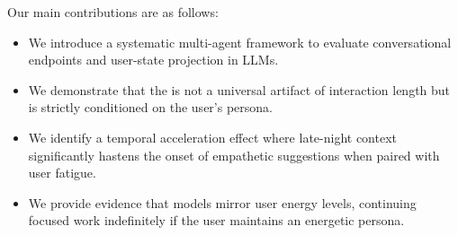  Our main contributions are as follows:
\begin{itemize}[leftmargin=*,itemsep=0pt,topsep=0pt]
    \item We introduce a systematic multi-agent framework to evaluate conversational endpoints and user-state projection in LLMs.
    \item We demonstrate that the \studyname is not a universal artifact of interaction length but is strictly conditioned on the user's persona.
    \item We identify a temporal acceleration effect where late-night context significantly hastens the onset of empathetic suggestions when paired with user fatigue.
    \item We provide evidence that models mirror user energy levels, continuing focused work indefinitely if the user maintains an energetic persona.
\end{itemize}
